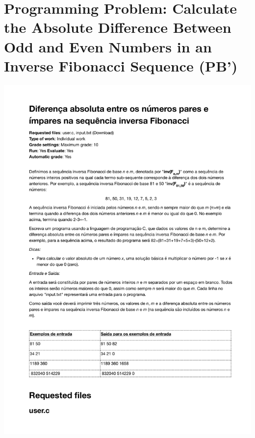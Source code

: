 \section{Programming Problem: Calculate the Absolute Difference Between Odd and Even Numbers in an Inverse Fibonacci Sequence (PB')}
\label{annex:pilot-study-pB}
\includegraphics[page=1,width=1\textwidth]{images/annex/pilot-study-pB.pdf}

\newpage
